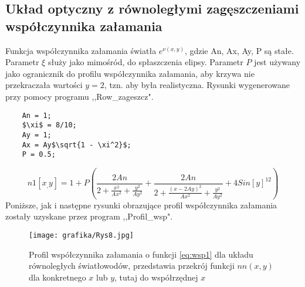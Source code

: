 \subsection{Układ optyczny z równoległymi zagęszczeniami współczynnika załamania}
Funkcja współczynnika załamania światła $e^{\nu(x,y)}$, gdzie An, Ax, Ay, P są stałe. Parametr $\xi$ służy jako mimośród, do spłaszczenia elipsy. Parametr $P$ jest używany jako ogranicznik do profilu współczynnika załamania, aby krzywa nie przekraczała wartości $y = 2$, tzn. aby była realistyczna. Rysunki wygenerowane przy pomocy programu ,,Row\_zageszcz".
\begin{lstlisting}
    An = 1;
    $\xi$ = 8/10;
    Ay = 1;
    Ax = Ay$\sqrt{1 - \xi^2}$;
    P = 0.5;
\end{lstlisting}
    
\begin{equation}\label{eq:wsp1}
     n1[x_,y_{}] = 1 + P(\frac{2 An}{2+\frac{x^2}{Ax^2}+\frac{y^2}{Ay^2}} + \frac{2 An}{2+\frac{(x-2Ay)^2}{Ax^2}+\frac{y^2}{Ay^2}} + 4 Sin[y]^{12})
\end{equation}
Poniższe, jak i następne rysunki obrazujące profil współczynnika załamania zostały uzyskane przez program ,,Profil\_wsp".
\begin{figure}[htb]
    \centering
    \texttt{[image: grafika/Rys8.jpg]}
    \caption{Profil współczynnika załamania o funkcji \ref{eq:wsp1} dla układu równoległych światłowodów, przedstawia przekrój funkcji $nn(x,y)$ dla konkretnego $x$ lub $y$, tutaj do współrzędnej $x$}
    \label{profil_wsp_zal}
\end{figure}

